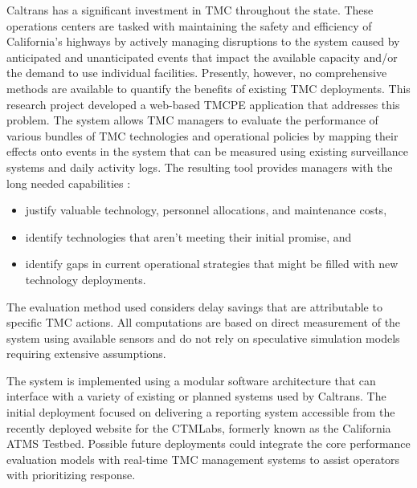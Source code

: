 \documentclass[12pt]{report}
\newcounter{time}
\begin{document}
Caltrans has a significant investment in \ac{TMC} throughout the
state. These operations centers are tasked with maintaining the safety
and efficiency of California's highways by actively managing
disruptions to the system caused by anticipated and unanticipated
events that impact the available capacity and/or the demand to use
individual facilities.  Presently, however, no comprehensive methods
are available to quantify the benefits of existing \ac{TMC}
deployments. This research project developed a web-based \ac{TMCPE}
application that addresses this problem. The system allows \ac{TMC}
managers to evaluate the performance of various bundles of \ac{TMC}
technologies and operational policies by mapping their effects onto
events in the system that can be measured using existing surveillance
systems and daily activity logs. The resulting tool provides managers
with the long needed capabilities :
\begin{itemize}
\item justify valuable technology, personnel allocations, and
  maintenance costs,
\item identify technologies that aren't meeting their initial promise,
  and
\item identify gaps in current operational strategies that might be
  filled with new technology deployments.
\end{itemize}
The evaluation method used considers delay savings that are
attributable to specific \ac{TMC} actions.  All computations are based
on direct measurement of the system using available sensors and do not
rely on speculative simulation models requiring extensive assumptions.

The system is implemented using a modular software architecture that
can interface with a variety of existing or planned systems used by
Caltrans. The initial deployment focused on delivering a reporting
system accessible from the recently deployed website for the
\ac{CTMLabs}, formerly known as the California \ac{ATMS}
Testbed. Possible future deployments could integrate the core
performance evaluation models with real-time \ac{TMC} management
systems to assist operators with prioritizing response.

\end{document}
